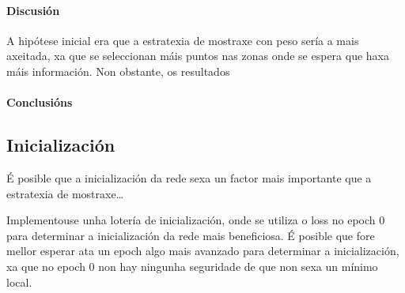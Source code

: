 \paragraph{Discusión}
\label{par:Discusión}

A hipótese inicial era que a estratexia de mostraxe con peso sería a mais axeitada, xa que se seleccionan máis puntos nas zonas onde se espera que haxa máis información.
Non obstante, os resultados 

\paragraph{Conclusións}
\label{par:Conclusións}

\subsection{Inicialización}
\label{subsec:Inicialización}

É posible que a inicialización da rede sexa un factor mais importante que a estratexia de mostraxe\dots

Implementouse unha lotería de inicialización, onde se utiliza o loss no epoch 0 para determinar a inicialización da rede mais beneficiosa.
É posible que fore mellor esperar ata un epoch algo mais avanzado para determinar a inicialización, xa que no epoch 0 non hay ningunha seguridade de que non sexa un mínimo local.
